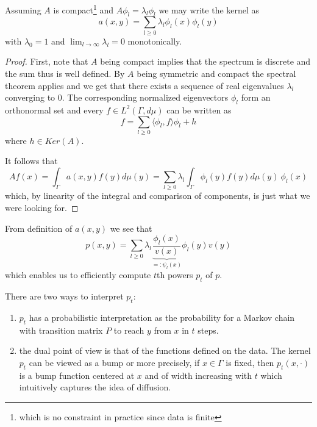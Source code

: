 \begin{theorem}
Assuming $A$ is compact\footnote{which is no constraint in practice since data is finite} and $A\phi_l=\lambda_l\phi_l$ we may write the kernel as
\begin{equation*}
a(x,y)=\sum_{l\geq 0}\lambda_l\phi_l(x)\phi_l(y)
\end{equation*}
with $\lambda_0 = 1$ and $\lim_{l\rightarrow\infty}\lambda_l = 0$ monotonically.
\end{theorem}
\begin{proof}
First, note that $A$ being compact implies that the spectrum is discrete and the sum thus is well defined. By $A$ being symmetric and compact the spectral theorem applies and we get that there exists a sequence of real eigenvalues $\lambda_l$ converging to $0$. The corresponding normalized eigenvectors $\phi_l$ form an orthonormal set and every $f\in L^2(\Gamma,d\mu)$ can be written as
$$f=\sum_{l\geq 0}\langle \phi_l,f\rangle \phi_l + h$$
where $h\in Ker(A)$.

It follows that
$$Af(x)=\int_\Gamma a(x,y)f(y)d\mu(y) = \sum_{l\geq 0}\lambda_l \int_\Gamma \phi_l(y)f(y)d\mu(y)\ \phi_l(x)$$
which, by linearity of the integral and comparison of components, is just what we were looking for.
\end{proof}
From definition of $a(x,y)$ we see that 
\begin{equation}\label{eq:spectralDecompositionOfP}
p(x,y)=\sum_{l\geq 0}\lambda_l\underbrace{\frac{\phi_l(x)}{v(x)}}_{=:\psi_l(x)}\phi_l(y)v(y)
\end{equation}
 which enables us to efficiently compute $t$th powers $p_t$ of $p$.

There are two ways to interpret $p_t$:
\begin{enumerate}
\item $p_t$ has a probabilistic interpretation as the probability for a Markov chain with transition matrix $P$ to reach $y$ from $x$ in $t$ steps.
\item the dual point of view is that of the functions defined on the data. The kernel $p_t$ can be viewed as a bump or more precisely, if $x\in\Gamma$ is fixed, then $p_t(x, \cdotp)$ is a bump function centered at $x$ and of width increasing with $t$ which intuitively captures the idea of diffusion.
\end{enumerate}

